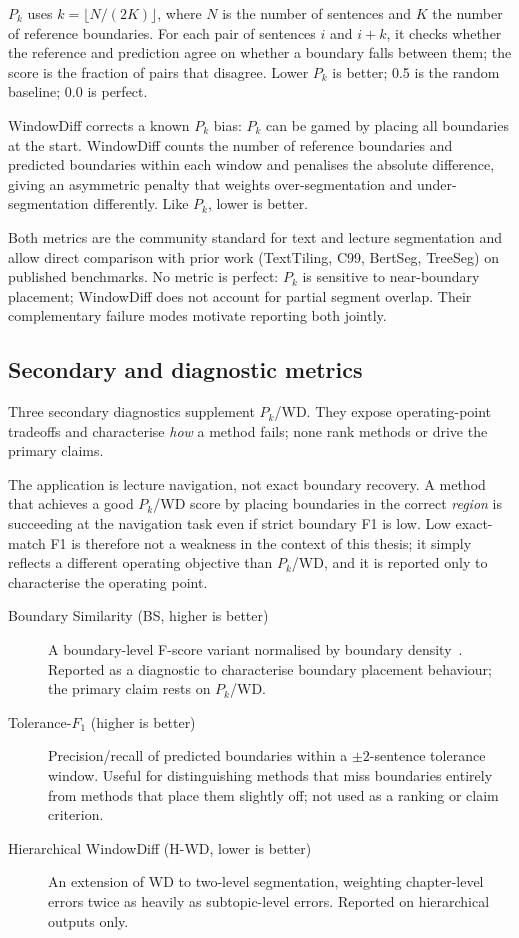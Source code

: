 $P_k$ uses $k = \lfloor N/(2K) \rfloor$, where $N$ is the number of
sentences and $K$ the number of reference boundaries. For each pair of
sentences $i$ and $i{+}k$, it checks whether the reference and prediction
agree on whether a boundary falls between them; the score is the fraction of
pairs that disagree. Lower $P_k$ is better; 0.5 is the random baseline;
0.0 is perfect.

WindowDiff \citep{pevzner2002critique} corrects a known $P_k$ bias: $P_k$
can be gamed by placing all boundaries at the start. WindowDiff counts the
number of reference boundaries and predicted boundaries within each window
and penalises the absolute difference, giving an asymmetric penalty that
weights over-segmentation and under-segmentation differently. Like $P_k$,
lower is better.

Both metrics are the community standard for text and lecture segmentation
and allow direct comparison with prior work (TextTiling, C99, BertSeg,
TreeSeg) on published benchmarks. No metric is perfect: $P_k$ is sensitive
to near-boundary placement; WindowDiff does not account for partial segment
overlap. Their complementary failure modes motivate reporting both jointly.

\subsection{Secondary and diagnostic metrics}
\label{sec:secondary_metrics}

Three secondary diagnostics supplement $P_k$/WD.
They expose operating-point tradeoffs and characterise
\emph{how} a method fails; none rank methods or drive the primary claims.

The application is lecture navigation, not exact boundary recovery.
A method that achieves a good $P_k$/WD score by placing boundaries in the
correct \emph{region} is succeeding at the navigation task even if strict
boundary F1 is low.
Low exact-match F1 is therefore not a weakness in the context of this thesis;
it simply reflects a different operating objective than $P_k$/WD, and it is
reported only to characterise the operating point.

\begin{description}
  \item[Boundary Similarity (BS, higher is better)] A boundary-level F-score
    variant normalised by boundary density~\citep{fournier2012}. Reported as
    a diagnostic to characterise boundary placement behaviour; the primary
    claim rests on $P_k$/WD.
  \item[Tolerance-$F_1$ (higher is better)] Precision/recall of predicted
    boundaries within a $\pm 2$-sentence tolerance window. Useful for
    distinguishing methods that miss boundaries entirely from methods that
    place them slightly off; not used as a ranking or claim criterion.
  \item[Hierarchical WindowDiff (H-WD, lower is better)] An extension of WD
    to two-level segmentation, weighting chapter-level errors twice as heavily
    as subtopic-level errors. Reported on hierarchical outputs only.
\end{description}

